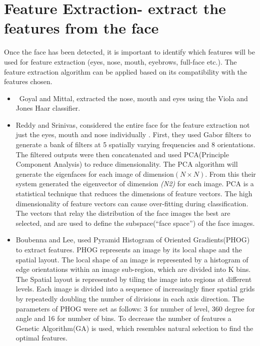 \section{Feature Extraction- extract the features from the face }
Once the face has been detected, it is important to identify which features will be used for feature extraction (eyes, nose, mouth, eyebrows, full-face etc.). The feature extraction algorithm can be applied based on its compatibility with the features chosen. 
\begin{itemize}
\item\ Goyal and Mittal, extracted the nose, mouth and eyes using the Viola and Jones Haar classifier\cite{1}.
\item Reddy and Srinivas, considered the entire face for the feature extraction not just the eyes, mouth and nose individually . First, they used Gabor filters to generate a bank of filters at 5 spatially varying frequencies and 8 orientations. The filtered outputs were then concatenated and used PCA(Principle Component Analysis) to reduce dimensionality. The PCA algorithm will generate the eigenfaces for each image of dimension$(N \times N)$. From this their system generated the eigenvector of dimension \textit{(N2)} for each image. PCA is a statistical technique that reduces the dimensions of feature vectors. The high dimensionality of feature vectors can cause over-fitting during classification. The vectors that relay the distribution of the face images the best are selected, and are used to define the subspace(“face space”) of the face images\cite{2}.

\item Boubenna and Lee, used Pyramid Histogram of Oriented Gradients(PHOG) to extract features. PHOG represents an image by its local shape and the spatial layout. The local shape of an image is represented by a histogram of edge orientations within an image sub-region, which are divided into K bins. The Spatial layout is represented by tiling the image into regions at different levels. Each image is divided into a sequence of increasingly finer spatial grids by repeatedly doubling the number of divisions in each axis direction\cite{phog}. The parameters of PHOG were set as follows: 3 for number of level, 360 degree for angle and 16 for number of bins. To decrease the number of features a Genetic Algorithm(GA) is used, which resembles natural selection to find the optimal features\cite{3}.
\end{itemize}


